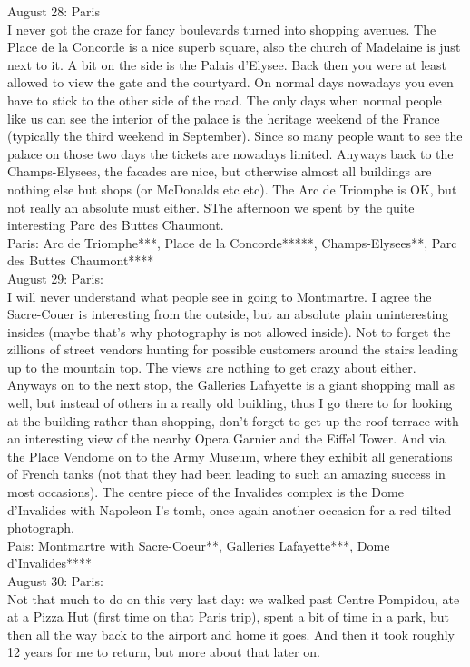 August 28: Paris\\
I never got the craze for fancy boulevards turned into shopping avenues. The Place de la Concorde is a nice superb square, also the church of Madelaine is just next to it. A bit on the side is the Palais d'Elysee. Back then you were at least allowed to view the gate and the courtyard. On normal days nowadays you even have to stick to the other side of the road. The only days when normal people like us can see the interior of the palace is the heritage weekend of the France (typically the third weekend in September). Since so many people want to see the palace on those two days the tickets are nowadays limited. Anyways back to the Champs-Elysees, the facades are nice, but otherwise almost all buildings are nothing else but shops (or McDonalds etc etc). The Arc de Triomphe is OK, but not really an absolute must either. SThe afternoon we spent by the quite interesting Parc des Buttes Chaumont.\\

Paris: Arc de Triomphe***, Place de la Concorde*****, Champs-Elysees**, Parc des Buttes Chaumont****\\

August 29: Paris:\\
I will never understand what people see in going to Montmartre. I agree the Sacre-Couer is interesting from the outside, but an absolute plain uninteresting insides (maybe that's why photography is not allowed inside). Not to forget the zillions of street vendors hunting for possible customers around the stairs leading up to the mountain top. The views are nothing to get crazy about either. Anyways on to the next stop, the Galleries Lafayette is a giant shopping mall as well, but instead of others in a really old building, thus I go there to for looking at the building rather than shopping, don't forget to get up the roof terrace with an interesting view of the nearby Opera Garnier and the Eiffel Tower. And via the Place Vendome on to the Army Museum, where they exhibit all generations of French tanks (not that they had been leading to such an amazing success in most occasions). The centre piece of the Invalides complex is the Dome d'Invalides with Napoleon I's tomb, once again another occasion for a red tilted photograph.\\

Pais: Montmartre with Sacre-Coeur**, Galleries Lafayette***, Dome d'Invalides****\\

August 30: Paris:\\ %
Not that much to do on this very last day: we walked past Centre Pompidou, ate at a Pizza Hut (first time on that Paris trip), spent a bit of time in a park, but then all the way back to the airport and home it goes. And then it took roughly 12 years for me to return, but more about that later on.

